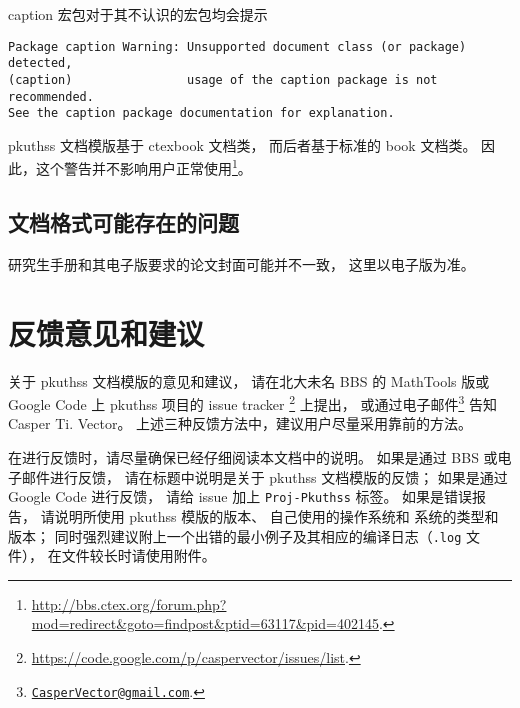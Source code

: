 		caption 宏包\supercite{caption}对于其不认识的宏包均会提示
\begin{Verbatim}[frame = single, fontsize = {\small}]
Package caption Warning: Unsupported document class (or package) detected,
(caption)                usage of the caption package is not recommended.
See the caption package documentation for explanation.
\end{Verbatim}
		pkuthss 文档模版基于 ctexbook 文档类，
		而后者基于标准的 book 文档类。
		因此，这个警告并不影响用户正常使用\footnote{%
			\url{http://bbs.ctex.org/forum.php?mod=redirect&goto=findpost&ptid=63117&pid=402145}.%
		}。

		\subsection{文档格式可能存在的问题}

		研究生手册和其电子版\supercite{pku-thesisstyle}要求的论文封面可能并不一致，
		这里以电子版为准。

	\section{反馈意见和建议}

	关于 pkuthss 文档模版的意见和建议，
	请在北大未名 BBS 的 MathTools 版或 %
	Google Code 上 pkuthss 项目的 issue tracker%
	\footnote{\url{https://code.google.com/p/caspervector/issues/list}.}%
	上提出，
	或通过电子邮件\footnote%
	{\href{mailto:CasperVector@gmail.com}{\texttt{CasperVector@gmail.com}}.}%
	告知 Casper Ti. Vector。
	上述三种反馈方法中，建议用户尽量采用靠前的方法。

	在进行反馈时，请尽量确保已经仔细阅读本文档中的说明。
	如果是通过 BBS 或电子邮件进行反馈，
	请在标题中说明是关于 pkuthss 文档模版的反馈；
	如果是通过 Google Code 进行反馈，
	请给 issue 加上 \verb|Proj-Pkuthss| 标签。
	如果是错误报告，
	请说明所使用 pkuthss 模版的版本、
	自己使用的操作系统和  系统的类型和版本；
	同时强烈建议附上一个出错的最小例子及其相应的编译日志（\verb|.log| 文件），
	在文件较长时请使用附件。

